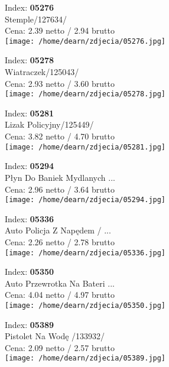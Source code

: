 {Index: \textbf{05276}\\
Stemple/127634/\\
Cena: 2.39 netto / 2.94 brutto\\
  \texttt{[image: /home/dearn/zdjecia/05276.jpg]}}\newline\newline

{Index: \textbf{05278}\\
Wiatraczek/125043/\\
Cena: 2.93 netto / 3.60 brutto\\
  \texttt{[image: /home/dearn/zdjecia/05278.jpg]}}\newline\newline

{Index: \textbf{05281}\\
Lizak Policyjny/125449/\\
Cena: 3.82 netto / 4.70 brutto\\
  \texttt{[image: /home/dearn/zdjecia/05281.jpg]}}\newline\newline

{Index: \textbf{05294}\\
Płyn Do Baniek Mydlanych  ...\\
Cena: 2.96 netto / 3.64 brutto\\
  \texttt{[image: /home/dearn/zdjecia/05294.jpg]}}\newline\newline

{Index: \textbf{05336}\\
Auto Policja Z Napędem  / ...\\
Cena: 2.26 netto / 2.78 brutto\\
  \texttt{[image: /home/dearn/zdjecia/05336.jpg]}}\newline\newline

{Index: \textbf{05350}\\
Auto Przewrotka Na Bateri ...\\
Cena: 4.04 netto / 4.97 brutto\\
  \texttt{[image: /home/dearn/zdjecia/05350.jpg]}}\newline\newline

{Index: \textbf{05389}\\
Pistolet Na Wodę /133932/\\
Cena: 2.09 netto / 2.57 brutto\\
  \texttt{[image: /home/dearn/zdjecia/05389.jpg]}}\newline\newline

